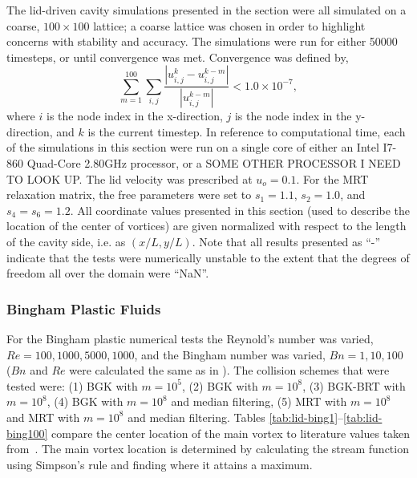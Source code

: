 \documentclass[pdftex,ms]{pittetd}
\begin{document}
The lid-driven cavity simulations presented in the section were all simulated on a coarse, $100 \times 100$ lattice; a coarse lattice was chosen in order to highlight concerns with stability and accuracy.
The simulations were run for either 50000 timesteps, or until convergence was met.
Convergence was defined by,
\begin{equation} \label{eq:convergence}
\sum_{m=1}^{100} \sum_{i, j} \frac{|u_{i, j}^k - u_{i, j}^{k-m}|}{|u_{i, j}^{k-m}|} < 1.0 \times 10^{-7},
\end{equation}
\noindent where $i$ is the node index in the x-direction, $j$ is the node index in the y-direction, and $k$ is the current timestep.
In reference to computational time, each of the simulations in this section were run on a single core of either an Intel I7-860 Quad-Core 2.80GHz processor, or a SOME OTHER PROCESSOR I NEED TO LOOK UP.
The lid velocity was prescribed at $u_o = 0.1$.
For the MRT relaxation matrix, the free parameters were set to $s_1 = 1.1$, $s_2 = 1.0$, and $s_4 = s_6 = 1.2$.
All coordinate values presented in this section (used to describe the location of the center of vortices) are given normalized with respect to the length of the cavity side, i.e. as $(x / L, y / L)$.
Note that all results presented as ``-'' indicate that the tests were numerically unstable to the extent that the degrees of freedom all over the domain were ``NaN''.

\subsubsection{Bingham Plastic Fluids}

For the Bingham plastic numerical tests the Reynold's number was varied, $Re = 100, 1000, 5000, 1000$, and the Bingham number was varied, $Bn = 1, 10, 100$ ($Bn$ and $Re$ were calculated the same as in ).
The collision schemes that were tested were: (1) BGK with $m = 10^5$, (2) BGK with $m = 10^8$, (3) BGK-BRT with $m = 10^8$, (4) BGK with $m = 10^8$ and median filtering, (5) MRT with $m = 10^8$ and MRT with $m = 10^8$ and median filtering.
Tables \ref{tab:lid-bing1}--\ref{tab:lid-bing100} compare the center location of the main vortex to literature values taken from~\citet{syrakos2014performance}.
The main vortex location is determined by calculating the stream function using Simpson's rule and finding where it attains a maximum.
\end{document}

